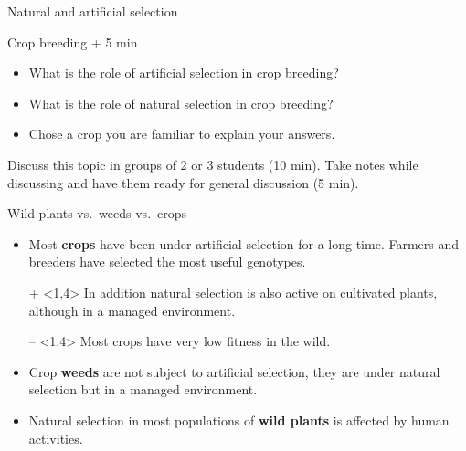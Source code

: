 \documentclass[10pt]{beamer}
\begin{document}
\begin{frame}{Natural and artificial selection \Discussion}
  \begin{alertblock}{Crop breeding  + 5 min}
    \begin{itemize}
      \item What is the role of artificial selection in crop breeding?
      \item What is the role of natural selection in crop breeding?
      \item Chose a crop you are familiar to explain your answers.
    \end{itemize}
  \end{alertblock}
Discuss this topic in groups of 2 or 3 students (10 min). Take notes while discussing and have them ready for general discussion (5 min).
\end{frame}

\begin{frame}{Wild plants vs.\ weeds vs.\ crops \Discussion}
    \begin{itemize}

        \item<1,4> Most \textbf{crops} have been under artificial selection for a
        long time. Farmers and breeders have selected the most useful
        genotypes.

        \item[{\small +}]<1,4> In addition natural selection is also active on cultivated plants,
        although in a managed environment. \DExamples

        \item[{\small --}]<1,4> Most crops have very low fitness in the wild. \DExamples

        \item<2,4> Crop \textbf{weeds} are not subject to artificial selection,
        they are under natural selection but in a managed environment. \DExamples

        \item<3,4> Natural selection in most populations of \textbf{wild plants} is affected by human activities. \DExamples
    \end{itemize}
\end{frame}
\end{document}
